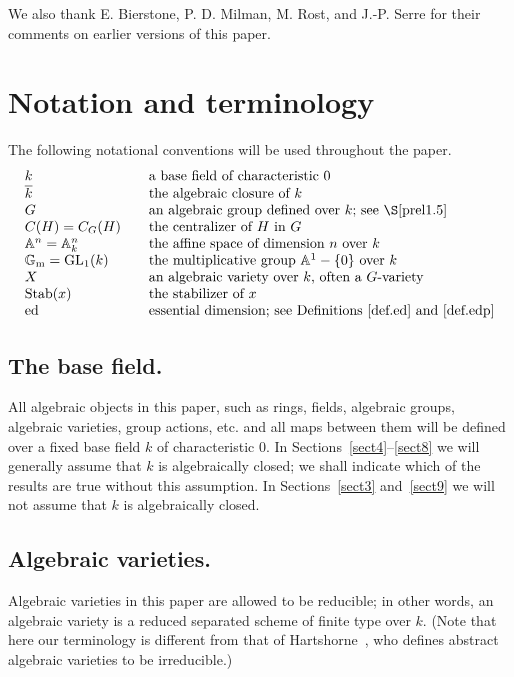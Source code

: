 We also thank E. Bierstone, P. D. Milman, M. Rost, and J.-P.
Serre for their comments on earlier versions of this paper.


\section{Notation and terminology}
\label{sect2}

The following notational conventions will be used throughout the paper.
\[
 \begin{array}{lcl}
 k          & & \mbox{a base field of characteristic 0} \\
 \kbar      & & \mbox{the algebraic closure of $k$} \\
 G          & & \mbox{an algebraic group defined over $k$; see~\S\ref{prel1.5}} \\
C(H)= C_G(H)     & & \mbox{the centralizer of $H$ in $G$} \\
\bbA^n=\bbA^n_k & & \mbox{the affine space of dimension $n$ over $k$} \\
\bbG_\ml= \GL_1(k) & & \mbox{the multiplicative group 
$\bbA^1-\{0\}$ over $k$} \\
 X          & & \mbox{an algebraic variety over $k$, often a $G$-variety} \\
 \Stab(x)   & & \mbox{the stabilizer of $x$} \\
\ed    & & \mbox{essential dimension;
                see Definitions~\ref{def.ed} and~\ref{def.edp}} 
\end{array}
\]

\subsection{The base field.} \label{pre0.5} All algebraic objects in this 
paper, such as rings, fields, algebraic groups, algebraic varieties, group
actions, etc. and all maps between them will be defined over a fixed 
base field $k$ of characteristic 0. In Sections~\ref{sect4}--\ref{sect8} we
will generally assume that $k$ is algebraically closed; 
we shall indicate which of the results are true without this
assumption.  In Sections~\ref{sect3} and~\ref{sect9} we will 
not assume that $k$ is algebraically closed.

\subsection{Algebraic varieties.} \label{prel0.5}
Algebraic varieties in this paper
are allowed to be reducible; in other words, an algebraic
variety is a reduced separated scheme of finite type over $k$.  (Note that 
here our terminology is different from that of Hartshorne~\cite{Hart}, 
who defines abstract algebraic varieties to be irreducible.)

